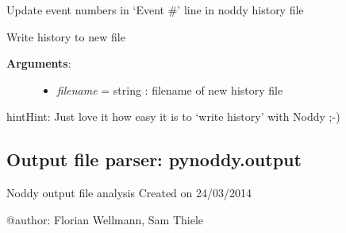 \documentclass[a4paper,10pt,english]{sphinxmanual}
\begin{document}
\begin{fulllineitems}
\begin{fulllineitems}
\end{fulllineitems}


\begin{fulllineitems}
\label{pynoddy:pynoddy.history.NoddyHistory.update_event_numbers}
Update event numbers in `Event \#' line in noddy history file

\end{fulllineitems}


\begin{fulllineitems}
\label{pynoddy:pynoddy.history.NoddyHistory.write_history}
Write history to new file
\begin{description}
\item[{\textbf{Arguments}:}] \leavevmode\begin{itemize}
\item {} 
\emph{filename} = string : filename of new history file

\end{itemize}

\end{description}

\begin{notice}{hint}{Hint:}
Just love it how easy it is to `write history' with Noddy ;-)
\end{notice}

\end{fulllineitems}


\end{fulllineitems}



\subsection{Output file parser: pynoddy.output}
\label{pynoddy:module-pynoddy.output}\label{pynoddy:output-file-parser-pynoddy-output}
Noddy output file analysis
Created on 24/03/2014

@author: Florian Wellmann, Sam Thiele
\end{document}
